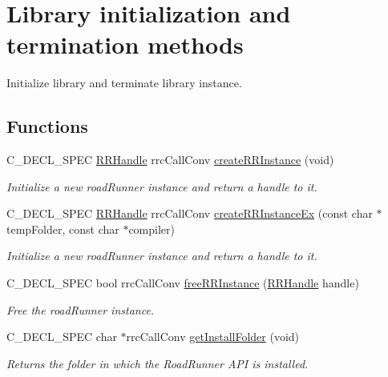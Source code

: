 \hypertarget{group__initialization}{\section{Library initialization and termination methods}
\label{group__initialization}
}


Initialize library and terminate library instance.  


\subsection*{Functions}
\begin{DoxyCompactItemize}
\item 
C\-\_\-\-D\-E\-C\-L\-\_\-\-S\-P\-E\-C \hyperlink{rrc__types_8h_a1d68f0592372208fa5a5f2799ea4b3ae}{R\-R\-Handle} rrc\-Call\-Conv \hyperlink{group__initialization_ga3285113641ecf1dc35c39fceb39b60fc}{create\-R\-R\-Instance} (void)
\begin{DoxyCompactList}\small\item\em Initialize a new road\-Runner instance and return a handle to it. \end{DoxyCompactList}\item 
C\-\_\-\-D\-E\-C\-L\-\_\-\-S\-P\-E\-C \hyperlink{rrc__types_8h_a1d68f0592372208fa5a5f2799ea4b3ae}{R\-R\-Handle} rrc\-Call\-Conv \hyperlink{group__initialization_ga0bd8e459a637346cdf196f91148015ec}{create\-R\-R\-Instance\-Ex} (const char $\ast$temp\-Folder, const char $\ast$compiler)
\begin{DoxyCompactList}\small\item\em Initialize a new road\-Runner instance and return a handle to it. \end{DoxyCompactList}\item 
C\-\_\-\-D\-E\-C\-L\-\_\-\-S\-P\-E\-C bool rrc\-Call\-Conv \hyperlink{group__initialization_gae0b2f65464742bba3beb0ad38dcdd863}{free\-R\-R\-Instance} (\hyperlink{rrc__types_8h_a1d68f0592372208fa5a5f2799ea4b3ae}{R\-R\-Handle} handle)
\begin{DoxyCompactList}\small\item\em Free the road\-Runner instance. \end{DoxyCompactList}\item 
C\-\_\-\-D\-E\-C\-L\-\_\-\-S\-P\-E\-C char $\ast$rrc\-Call\-Conv \hyperlink{group__initialization_ga53c5421073ec3d6b8be32cbe3ac93ba3}{get\-Install\-Folder} (void)
\begin{DoxyCompactList}\small\item\em Returns the folder in which the Road\-Runner A\-P\-I is installed. \end{DoxyCompactList}\item 

\end{DoxyCompactItemize}
